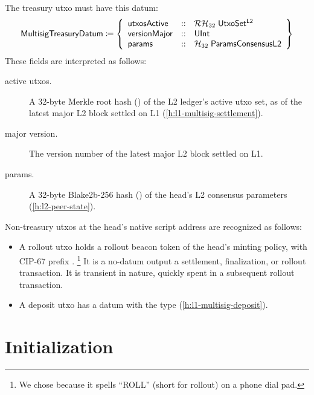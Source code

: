 \documentclass[../hydrozoa.tex]{subfiles}
\begin{document}
The treasury utxo must have this datum:
\begin{equation*}
  \mathsf{MultisigTreasuryDatum} \coloneq \left\{
    \begin{array}{lll}
      \mathsf{utxosActive}  &::& \mathcal{RH}_{32} \; \mathsf{UtxoSet^{L2}} \\
      \mathsf{versionMajor} &::& \mathsf{UInt} \\
      \mathsf{params} &::& \mathcal{H}_{32} \; \mathsf{ParamsConsensusL2}
    \end{array}\right\}
\end{equation*}
These fields are interpreted as follows:
\begin{description}
  \item[active utxos.] A 32-byte Merkle root hash () of the L2 ledger's active utxo set, as of the latest major L2 block settled on L1 (\cref{h:l1-multisig-settlement}).
  \item[major version.] The version number of the latest major L2 block settled on L1.
  \item[params.] A 32-byte Blake2b-256 hash () of the head's L2 consensus parameters (\cref{h:l2-peer-state}).
\end{description}

Non-treasury utxos at the head's native script address are recognized as follows:
\begin{itemize}
  \item A rollout utxo holds a rollout beacon token of the head's minting policy, with CIP-67 prefix \headRolloutToken{}.%
    \footnote{We chose \headRolloutToken{} because it spells ``ROLL'' (short for rollout) on a phone dial pad.}
    It is a no-datum output a settlement, finalization, or rollout transaction.
    It is transient in nature, quickly spent in a subsequent rollout transaction.
  \item A deposit utxo has a datum with the  type (\cref{h:l1-multisig-deposit}).
\end{itemize}
  
\section{Initialization}%
\label{h:l1-multisig-initialization}%
\end{document}
